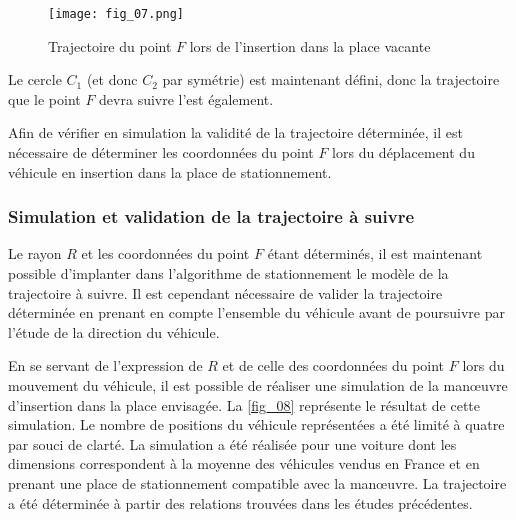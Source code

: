 \begin{figure}[H]
\centering
\texttt{[image: fig\_07.png]}
\caption{Trajectoire du point $F$ lors de l’insertion dans la place vacante \label{fig_07}}
\end{figure}



Le cercle $C_1$ (et donc $C_2$ par symétrie) est maintenant défini, donc la trajectoire que le point $F$ devra suivre l’est également.

Afin de vérifier en simulation la validité de la trajectoire déterminée, il est nécessaire de déterminer les coordonnées du point $F$ lors du déplacement du véhicule en insertion dans la place de stationnement.

\subsubsection{ Simulation et validation de la trajectoire à suivre}

Le rayon $R$ et les coordonnées du point $F$ étant déterminés, il est maintenant possible d’implanter dans l’algorithme de stationnement le modèle de la trajectoire à suivre. Il est cependant nécessaire de valider la trajectoire
déterminée en prenant en compte l’ensemble du véhicule avant de poursuivre par l’étude de la direction du
véhicule.

En se servant de l’expression de $R$ et de celle des coordonnées du point $F$ lors du mouvement du véhicule, il est
possible de réaliser une simulation de la manœuvre d’insertion dans la place envisagée.
La \autoref{fig_08} représente le résultat de cette simulation. Le nombre de positions du véhicule représentées a été limité
à quatre par souci de clarté. La simulation a été réalisée pour une voiture dont les dimensions correspondent
à la moyenne des véhicules vendus en France et en prenant une place de stationnement compatible avec la
manœuvre. La trajectoire a été déterminée à partir des relations trouvées dans les études précédentes.

